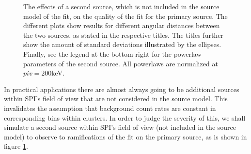 \documentclass{report}
\begin{document}
\begin{figure}[h]
  \centering
  \caption{The effects of a second source, which is not included in the source model of the fit, on the quality of the fit for the primary source. The different plots show results for different angular distances between the two sources, as stated in the respective titles. The titles further show the amount of standard deviations illustrated by the ellipses. Finally, see the legend at the bottom right for the powerlaw parameters of the second source. All powerlaws are normalized at $piv=200$keV.}
  \label{fig sec source}
\end{figure}

In practical applications there are almost always going to be additional sources within SPI's field of view that are not considered in the source model. This invalidates the assumption that background count rates are constant in corresponding bins within clusters. In order to judge the severity of this, we shall simulate a second source within SPI's field of view (not included in the source model) to observe to ramifications of the fit on the primary source, as is shown in figure \ref{fig sec source}. 
\end{document}
